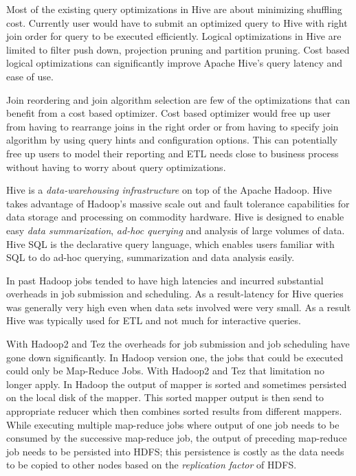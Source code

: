 \documentclass{vldb}
\begin{document}
Most of the existing query optimizations in Hive are about minimizing shuffling cost. Currently user would have to submit an optimized query to Hive with right join order for query to be executed efficiently. Logical optimizations in Hive are limited to filter push down, projection pruning and partition pruning. Cost based logical optimizations can significantly improve Apache Hive’s query latency and ease of use.

Join reordering and join algorithm selection are few of the optimizations that can benefit from a cost based optimizer. Cost based optimizer would free up user from having to rearrange joins in the right order or from having to specify join algorithm by using query hints and configuration options. This can potentially free up users to model their reporting and ETL needs close to business process without having to worry about query optimizations.

Hive is a \textit{data-warehousing infrastructure} on top of the Apache Hadoop. 
Hive takes advantage of Hadoop’s massive scale out and fault tolerance capabilities for data storage and processing on commodity hardware. 
Hive is designed to enable easy \textit{data summarization}, \textit{ad-hoc querying} and analysis of large volumes of data. 
Hive SQL is the declarative query language, which enables users familiar with SQL to do ad-hoc querying, summarization and data analysis easily.

In past Hadoop jobs tended to have high latencies and incurred substantial overheads in job submission and scheduling. 
As a result-latency for Hive queries was generally very high even when data sets involved were very small. 
As a result Hive was typically used for ETL and not much for interactive queries. 

With Hadoop2 and Tez the overheads for job submission and job scheduling have gone down significantly. 
In Hadoop version one, the jobs that could be executed could only be Map-Reduce Jobs. 
With Hadoop2 and Tez that limitation no longer apply.
In Hadoop the output of mapper is sorted and sometimes persisted on the local disk of the mapper. 
This sorted mapper output is then send to appropriate reducer which then combines sorted results from different mappers. 
While executing multiple map-reduce jobs where output of one job needs to be consumed by the successive map-reduce job, 
the output of preceding map-reduce job needs to be persisted into HDFS; this persistence is costly as the data needs to be copied to other nodes based on the \textit{replication factor} of HDFS.
\end{document}
